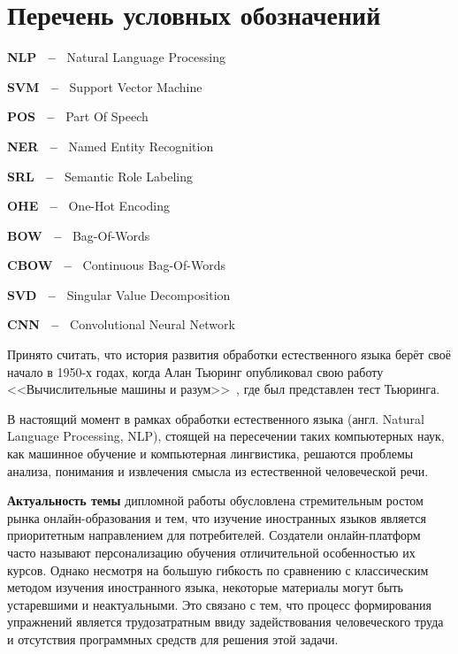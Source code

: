 


\setcounter{secnumdepth}{5}
\setcounter{tocdepth}{5}
\newcommand\simpleparagraph[1]{%
  \stepcounter{paragraph}\paragraph*{\theparagraph\quad{}#1}}
  



\section*{Перечень условных обозначений}
\label{sec:table}

\textbf{NLP ~--~} Natural Language Processing

\textbf{SVM ~--~} Support Vector Machine

\textbf{POS ~--~} Part Of Speech

\textbf{NER ~--~} Named Entity Recognition

\textbf{SRL ~--~} Semantic Role Labeling

\textbf{OHE ~--~} One-Hot Encoding

\textbf{BOW ~--~} Bag-Of-Words

\textbf{CBOW ~--~} Continuous Bag-Of-Words

\textbf{SVD ~--~} Singular Value Decomposition

\textbf{CNN ~--~} Convolutional Neural Network


\newpage
\Intro
Принято считать, что история развития обработки естественного языка берёт своё начало в 1950-х годах, когда Алан Тьюринг опубликовал свою работу <<Вычислительные машины и разум>>~\cite{turing1950computing}, где был представлен тест Тьюринга.

В настоящий момент в рамках обработки естественного языка (англ. Natural Language Processing, NLP), стоящей на пересечении таких компьютерных наук, как машинное обучение и компьютерная лингвистика, решаются проблемы анализа, понимания и извлечения смысла из естественной человеческой речи.

\textbf{Актуальность темы} дипломной работы обусловлена стремительным ростом рынка онлайн-образования и тем, что изучение иностранных языков является приоритетным направлением для потребителей.
Создатели онлайн-платформ часто называют персонализацию обучения отличительной особенностью их курсов. Однако несмотря на большую гибкость по сравнению с классическим методом изучения иностранного языка, некоторые материалы могут быть устаревшими и неактуальными. Это связано с тем, что процесс формирования упражнений является трудозатратным ввиду задействования человеческого труда и отсутствия программных средств для решения этой задачи.

